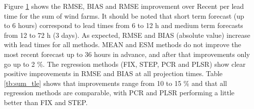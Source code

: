 Figure \ref{fig:tle_decerr_hz} shows the RMSE, BIAS and RMSE improvement over Recent per lead time for the sum of wind farms. It should be noted that short term forecast (up to 6 hours) correspond to lead times from 6 to 12 h and medium term forecasts from 12 to 72 h (3 days). As expected, RMSE and BIAS (absolute value) increase with lead times for all methods. MEAN and ESM methods do not improve the most recent forecast up to 36 hours in advance, and after that improvements only go up to 2 \%. The regression methods (FIX, STEP, PCR and PLSR) show clear positive improvements in RMSE and BIAS at all projection times. Table \ref{tb:sum_tle} shows that improvements range from 10 to 15 \% and that all regression methods are comparable, with PCR and PLSR performing a little better than FIX and STEP. 

\begin{figure}[!htp]
    \centering
    \\
    \label{fig:tle_decerr_hz}
\end{figure}

